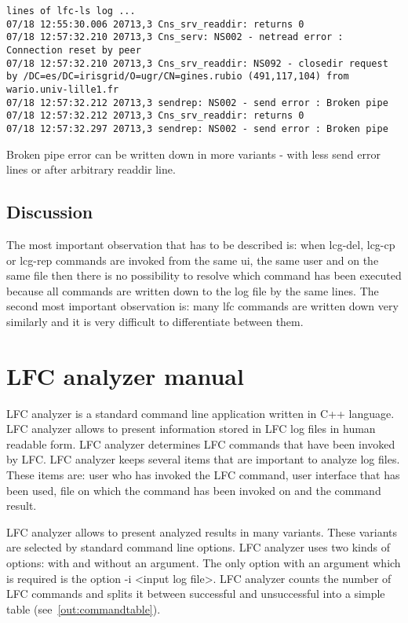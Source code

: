 \documentclass[a4paper, 11pt]{article} %
\begin{document}
\newpage

\begin{lstlisting}[label={log:brokenpipe},caption={sendrep - Broken pipe}]
lines of lfc-ls log ...
07/18 12:55:30.006 20713,3 Cns_srv_readdir: returns 0
07/18 12:57:32.210 20713,3 Cns_serv: NS002 - netread error : Connection reset by peer
07/18 12:57:32.210 20713,3 Cns_srv_readdir: NS092 - closedir request by /DC=es/DC=irisgrid/O=ugr/CN=gines.rubio (491,117,104) from wario.univ-lille1.fr
07/18 12:57:32.212 20713,3 sendrep: NS002 - send error : Broken pipe
07/18 12:57:32.212 20713,3 Cns_srv_readdir: returns 0
07/18 12:57:32.297 20713,3 sendrep: NS002 - send error : Broken pipe
\end{lstlisting}

Broken pipe error can be written down in more variants - with less send error lines or after arbitrary readdir line.

\subsection{Discussion}

The most important observation that has to be described is: when lcg-del, lcg-cp or lcg-rep commands are invoked from the same ui, the same user and on the same file then there is no possibility to resolve which command has been executed because all commands are written down to the log file by the same lines. The second most important observation is: many lfc commands are written down very similarly and it is very difficult to differentiate between them. 

\section*{LFC analyzer manual}

LFC analyzer is a standard command line application written in C++ language. LFC analyzer allows to present information stored in LFC log files in human readable form. LFC analyzer determines LFC commands that have been invoked by LFC. LFC analyzer keeps several items that are important to analyze log files. These items are: user who has invoked the LFC command, user interface that has been used, file on which the command has been invoked on and the command result.

LFC analyzer allows to present analyzed results in many variants. These variants are selected by standard command line options. LFC analyzer uses two kinds of options: with and without an argument. The only option with an argument which is required is the option -i <input log file>. LFC analyzer counts the number of LFC commands and splits it between successful and unsuccessful into a simple table (see~\ref{out:commandtable}).
\end{document}
